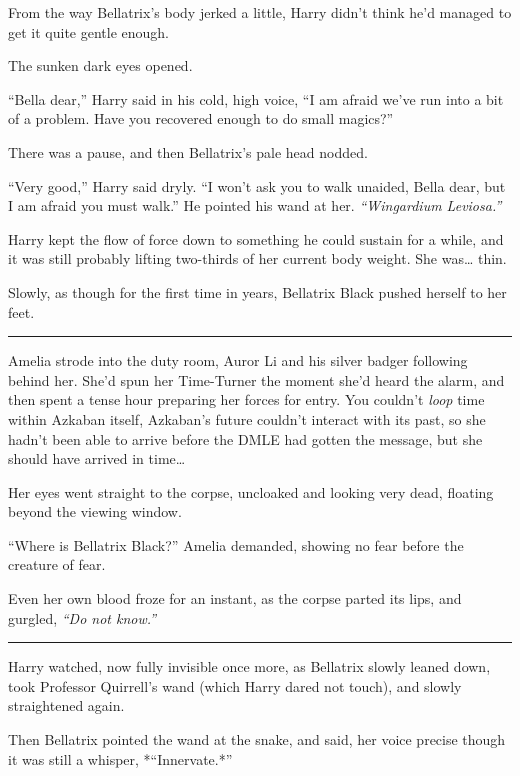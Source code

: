 From the way Bellatrix's body jerked a little, Harry didn't think he'd
managed to get it quite gentle enough.

The sunken dark eyes opened.

``Bella dear,'' Harry said in his cold, high voice, ``I am afraid we've
run into a bit of a problem. Have you recovered enough to do small
magics?''

There was a pause, and then Bellatrix's pale head nodded.

``Very good,'' Harry said dryly. ``I won't ask you to walk unaided,
Bella dear, but I am afraid you must walk.'' He pointed his wand at her.
\emph{``Wingardium Leviosa.''}

Harry kept the flow of force down to something he could sustain for a
while, and it was still probably lifting two-thirds of her current body
weight. She was\ldots{} thin.

Slowly, as though for the first time in years, Bellatrix Black pushed
herself to her feet.

\begin{center}\rule{3in}{0.4pt}\end{center}

Amelia strode into the duty room, Auror Li and his silver badger
following behind her. She'd spun her Time-Turner the moment she'd heard
the alarm, and then spent a tense hour preparing her forces for entry.
You couldn't \emph{loop} time within Azkaban itself, Azkaban's future
couldn't interact with its past, so she hadn't been able to arrive
before the DMLE had gotten the message, but she should have arrived in
time\ldots{}

Her eyes went straight to the corpse, uncloaked and looking very dead,
floating beyond the viewing window.

``Where is Bellatrix Black?'' Amelia demanded, showing no fear before
the creature of fear.

Even her own blood froze for an instant, as the corpse parted its lips,
and gurgled, \emph{``Do not know.''}

\begin{center}\rule{3in}{0.4pt}\end{center}

Harry watched, now fully invisible once more, as Bellatrix slowly leaned
down, took Professor Quirrell's wand (which Harry dared not touch), and
slowly straightened again.

Then Bellatrix pointed the wand at the snake, and said, her voice
precise though it was still a whisper, *``Innervate.*''

